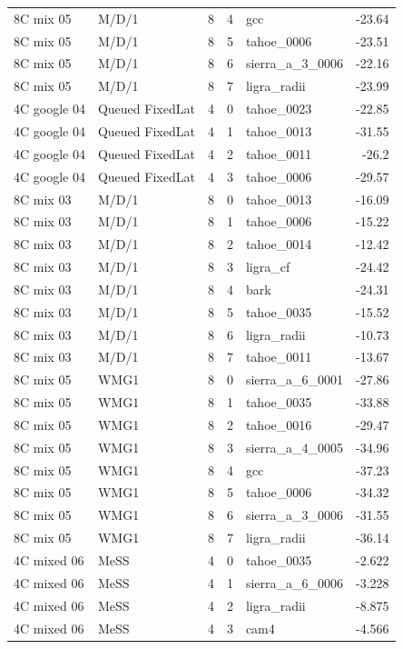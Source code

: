 \begin{tabular}{llrrlr}
8C mix 05 & M/D/1 & 8 & 4 & gcc & -23.64 \\
8C mix 05 & M/D/1 & 8 & 5 & tahoe\_0006 & -23.51 \\
8C mix 05 & M/D/1 & 8 & 6 & sierra\_a\_3\_0006 & -22.16 \\
8C mix 05 & M/D/1 & 8 & 7 & ligra\_radii & -23.99 \\
4C google 04 & Queued FixedLat & 4 & 0 & tahoe\_0023 & -22.85 \\
4C google 04 & Queued FixedLat & 4 & 1 & tahoe\_0013 & -31.55 \\
4C google 04 & Queued FixedLat & 4 & 2 & tahoe\_0011 & -26.2 \\
4C google 04 & Queued FixedLat & 4 & 3 & tahoe\_0006 & -29.57 \\
8C mix 03 & M/D/1 & 8 & 0 & tahoe\_0013 & -16.09 \\
8C mix 03 & M/D/1 & 8 & 1 & tahoe\_0006 & -15.22 \\
8C mix 03 & M/D/1 & 8 & 2 & tahoe\_0014 & -12.42 \\
8C mix 03 & M/D/1 & 8 & 3 & ligra\_cf & -24.42 \\
8C mix 03 & M/D/1 & 8 & 4 & bark & -24.31 \\
8C mix 03 & M/D/1 & 8 & 5 & tahoe\_0035 & -15.52 \\
8C mix 03 & M/D/1 & 8 & 6 & ligra\_radii & -10.73 \\
8C mix 03 & M/D/1 & 8 & 7 & tahoe\_0011 & -13.67 \\
8C mix 05 & WMG1 & 8 & 0 & sierra\_a\_6\_0001 & -27.86 \\
8C mix 05 & WMG1 & 8 & 1 & tahoe\_0035 & -33.88 \\
8C mix 05 & WMG1 & 8 & 2 & tahoe\_0016 & -29.47 \\
8C mix 05 & WMG1 & 8 & 3 & sierra\_a\_4\_0005 & -34.96 \\
8C mix 05 & WMG1 & 8 & 4 & gcc & -37.23 \\
8C mix 05 & WMG1 & 8 & 5 & tahoe\_0006 & -34.32 \\
8C mix 05 & WMG1 & 8 & 6 & sierra\_a\_3\_0006 & -31.55 \\
8C mix 05 & WMG1 & 8 & 7 & ligra\_radii & -36.14 \\
4C mixed 06 & MeSS & 4 & 0 & tahoe\_0035 & -2.622 \\
4C mixed 06 & MeSS & 4 & 1 & sierra\_a\_6\_0006 & -3.228 \\
4C mixed 06 & MeSS & 4 & 2 & ligra\_radii & -8.875 \\
4C mixed 06 & MeSS & 4 & 3 & cam4 & -4.566 \\

\end{tabular}
